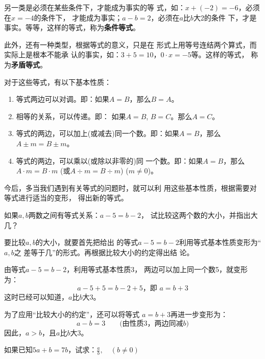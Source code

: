 另一类是必须在某些条件下，才能成为事实的等
式，如：$x+(-2)=-6$，必须在$x=-4$的条件下，
才能成为事实；$a-b=2$，必须在$a$比$b$大2的条件
下，才是事实。等等，这样的等式，称为\textbf{条件等式}。

此外，还有一种类型，根据等式的意义，只是在
形式上用等号连结两个算式，而实际上是根本不能承
认的事实，如：$3+5=10$，$0\cdot x=-5$等。这样的等式，
称为\textbf{矛盾等式}。

对于这些等式，有以下基本性质：

\begin{blk}{}
	\begin{enumerate}
		\item 等式两边可以对调。即：如果$A= B$，那么$B=A$。
		\item 相等的关系，可以传递。即：
		如果$A=B$,  $B=C$。那么$A=C$。
		\item 等式的两边，可以加上(或减去)同一个数。即：如果$A= B$，那么$A\pm m=B\pm m$。
		\item 等式的两边，可以乘以(或除以非零的)同
		一个数。即：如果$A=B$，那么$A\cdot m=B\cdot m$ (或$A\div m =
		B\div m$) ($m\ne 0$)。
	\end{enumerate}
\end{blk}


今后，多当我们遇到有关等式的问题时，就可以利
用这些基本性质，根据需要对等式进行适当的变形，
得出新的等式。

\begin{example}
	如果$a,b$两数之间有等式关系：$a-5=b-2$，
	试比较这两个数的大小，并指出大几？
\end{example}

\begin{analyze}
	要比较$a,b$的大小，就要首先把给出
	的等式$a-5=b-2$利用等式基本性质变形为“$a, b$之
	差等于几”的形式。再根据比较大小的约定得出结
	论。
\end{analyze}

\begin{solution}
	由等式$a-5=b-2$，利用等式基本性质3，
	两边可以加上同一个数5，就变形为：
	\[a-5+5=b-2+5，\text{即 } a=b+3\]
	这时已经可以知道，$a$比$b$大3。
	
	为了应用“比较大小的约定”，还可以将等式
	$a=b+3$再进一步变形为：
	\[a-b=3\qquad \text{(由性质3，两边同减$b$)}\]
	因此，$a>b$，且$a$比$b$大3。
\end{solution}

\begin{example}
	如果已知$5a + b = 7b$，试求：$\frac{a}{b},\quad (b\ne 0)$
\end{example}

